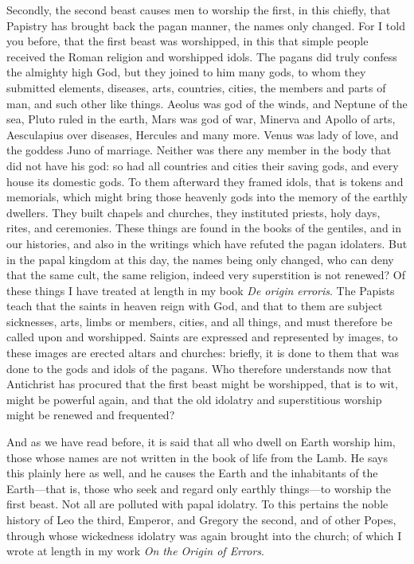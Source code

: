 Secondly, the second beast causes men to worship the first, in this chiefly, that Papistry has brought back the pagan manner, the names only changed. For I told you before, that the first beast was worshipped, in this that simple people received the Roman religion and worshipped idols. The pagans did truly confess the almighty high God, but they joined to him many gods, to whom they submitted elements, diseases, arts, countries, cities, the members and parts of man, and such other like things. Aeolus was god of the winds, and Neptune of the sea, Pluto ruled in the earth, Mars was god of war, Minerva and Apollo of arts, Aesculapius over diseases, Hercules and many more. Venus was lady of love, and the goddess Juno of marriage. Neither was there any member in the body that did not have his god: so had all countries and cities their saving gods, and every house its domestic gods. To them afterward they framed idols, that is tokens and memorials, which might bring those heavenly gods into the memory of the earthly dwellers. They built chapels and churches, they instituted priests, holy days, rites, and ceremonies. These things are found in the books of the gentiles, and in our histories, and also in the writings which have refuted the pagan idolaters. But in the papal kingdom at this day, the names being only changed, who can deny that the same cult, the same religion, indeed very superstition is not renewed? Of these things I have treated at length in my book \textit{De origin erroris}. The Papists teach that the saints in heaven reign with God, and that to them are subject sicknesses, arts, limbs or members, cities, and all things, and must therefore be called upon and worshipped. Saints are expressed and represented by images, to these images are erected altars and churches: briefly, it is done to them that was done to the gods and idols of the pagans. Who therefore understands now that Antichrist has procured that the first beast might be worshipped, that is to wit, might be powerful again, and that the old idolatry and superstitious worship might be renewed and frequented?

And as we have read before, it is said that all who dwell on Earth worship him, those whose names are not written in the book of life from the Lamb. He says this plainly here as well, and he causes the Earth and the inhabitants of the Earth—that is, those who seek and regard only earthly things—to worship the first beast. Not all are polluted with papal idolatry. To this pertains the noble history of Leo the third, Emperor, and Gregory the second, and of other Popes, through whose wickedness idolatry was again brought into the church; of which I wrote at length in my work \textit{On the Origin of Errors}.

